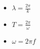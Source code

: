

\vspace*{\fill}
\centering

\begin{itemize}
    \item $\displaystyle \lambda = \frac{2\pi}{k}$ 
    \item $\displaystyle T = \frac{2\pi}{\omega}$
    \item $\displaystyle \omega = 2\pi f$
\end{itemize}

\centering
\vspace*{\fill}

